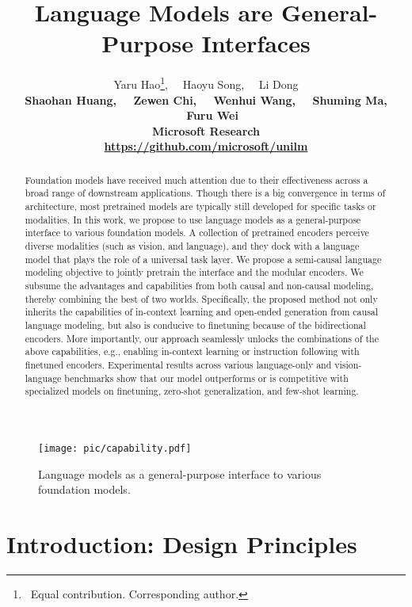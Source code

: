 \documentclass{article}
\title{Language Models are General-Purpose Interfaces}
\author{Yaru Hao\thanks{~Equal contribution.  Corresponding author.}, ~~Haoyu Song\footnotemark[1], ~~Li Dong\footnotemark[1] \\
\bf Shaohan Huang, ~~Zewen Chi, ~~Wenhui Wang, ~~Shuming Ma, ~~Furu Wei \\
Microsoft Research \\
\url{https://github.com/microsoft/unilm}
}
\theoremstyle{plain}
\theoremstyle{definition}
\theoremstyle{remark}
\begin{document}
\maketitle

\begin{abstract}
Foundation models have received much attention due to their effectiveness across a broad range of downstream applications.
Though there is a big convergence in terms of architecture, most pretrained models are typically still developed for specific tasks or modalities.
In this work, we propose to use language models as a general-purpose interface to various foundation models.
A collection of pretrained encoders perceive diverse modalities (such as vision, and language), and they dock with a language model that plays the role of a universal task layer.
We propose a semi-causal language modeling objective to jointly pretrain the interface and the modular encoders.
We subsume the advantages and capabilities from both causal and non-causal modeling, thereby combining the best of two worlds.
Specifically, the proposed method not only inherits the capabilities of in-context learning and open-ended generation from causal language modeling, but also is conducive to finetuning because of the bidirectional encoders.
More importantly, our approach seamlessly unlocks the combinations of the above capabilities, e.g., enabling in-context learning or instruction following with finetuned encoders.
Experimental results across various language-only and vision-language benchmarks show that our model outperforms or is competitive with specialized models on finetuning, zero-shot generalization, and few-shot learning.
\end{abstract}


\begin{figure*}[h]
\centering
\texttt{[image: pic/capability.pdf]}
\caption{Language models as a general-purpose interface to various foundation models.}
\label{fig:capability}
\end{figure*}

\newpage

\tableofcontents

\newpage


\section{Introduction: Design Principles}
\label{sec:intro}
\end{document}
